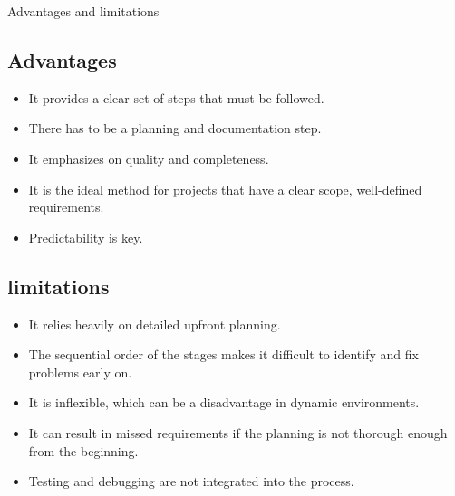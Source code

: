 \begin{section}{Advantages and limitations}
    \subsection{Advantages}
    
    \begin{itemize}
        \item It provides a clear set of steps that must be followed.
        
        \item There has to be a planning and documentation step.
        
        \item It emphasizes on quality and completeness.
        
        \item It is the ideal method for projects that have a clear scope, well-defined requirements.
        
        \item Predictability is key.
    
    \end{itemize}
    \subsection{limitations}
    
    \begin{itemize}
        \item It relies heavily on detailed upfront planning.
               
        \item The sequential order of the stages makes it difficult to identify and fix problems early on.
        
        \item It is inflexible, which can be a disadvantage in dynamic environments.
        \
        \item It can result in missed requirements if the planning is not thorough enough from the beginning.
        
        \item Testing and debugging are not integrated into the process.
   
    \end{itemize}
    
    
    \end{section}